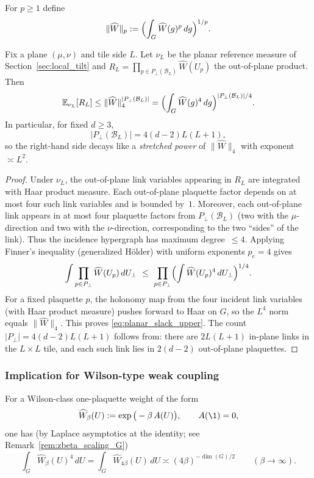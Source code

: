 For $p\ge 1$ define
\[
\|\widehat W\|_{p}:=\Bigl(\int_G \widehat W(g)^{p}\,dg\Bigr)^{1/p}.
\]

\begin{lemma}\label{lem:planar_slack_upper}
Fix a plane $(\mu,\nu)$ and tile side $L$.
Let $\nu_L$ be the planar reference measure of Section~\ref{sec:local_tilt} and
$R_L=\prod_{p\in P_{\perp}(\mathcal B_L)}\widehat W(U_p)$ the out-of-plane product.
Then
\begin{equation}\label{eq:planar_slack_upper}
\mathbb E_{\nu_L}[R_L] \le \|\widehat W\|_{4}^{|P_{\perp}(\mathcal B_L)|}
=
\Bigl(\int_G \widehat W(g)^{4}\,dg\Bigr)^{|P_{\perp}(\mathcal B_L)|/4}.
\end{equation}
In particular, for fixed $d\ge 3$,
\[
|P_{\perp}(\mathcal B_L)| = 4(d-2)L(L+1),
\]
so the right-hand side decays like a \emph{stretched power} of $\|\widehat W\|_4$ with exponent $\asymp L^2$.
\end{lemma}

\begin{proof}
Under $\nu_L$, the out-of-plane link variables appearing in $R_L$ are integrated with Haar product measure.
Each out-of-plane plaquette factor depends on at most four such link variables and is bounded by~$1$.
Moreover, each out-of-plane link appears in at most four plaquette factors from $P_\perp(\mathcal B_L)$
(two with the $\mu$-direction and two with the $\nu$-direction, corresponding to the two ``sides'' of the link).
Thus the incidence hypergraph has maximum degree~$\le 4$.
Applying Finner's inequality (generalized H\"older) with uniform exponents $p_e=4$ gives
\[
\int \prod_{p\in P_{\perp}} \widehat W(U_p)\,dU_{\perp}
\ \le\
\prod_{p\in P_{\perp}}\Bigl(\int \widehat W(U_p)^{4}\,dU_{\perp}\Bigr)^{1/4}.
\]
For a fixed plaquette $p$, the holonomy map from the four incident link variables (with Haar product measure)
pushes forward to Haar on $G$, so the $L^4$ norm equals $\|\widehat W\|_4$.
This proves \eqref{eq:planar_slack_upper}.
The count $|P_\perp|=4(d-2)L(L+1)$ follows from:
there are $2L(L+1)$ in-plane links in the $L\times L$ tile, and each such link lies in $2(d-2)$ out-of-plane plaquettes.
\end{proof}

\subsubsection{Implication for Wilson-type weak coupling}

For a Wilson-class one-plaquette weight of the form
\[
\widehat W_\beta(U):=\exp\big(-\beta\,A(U)\big),\qquad A(\1)=0,
\]
one has (by Laplace asymptotics at the identity; see Remark~\ref{rem:zbeta_scaling_G})
\begin{equation}\label{eq:W4_asymptotic}
\int_{G} \widehat W_\beta(U)^4\,dU
=\int_{G} \widehat W_{4\beta}(U)\,dU
\asymp (4\beta)^{-\dim(G)/2}\qquad(\beta\to\infty).
\end{equation}

